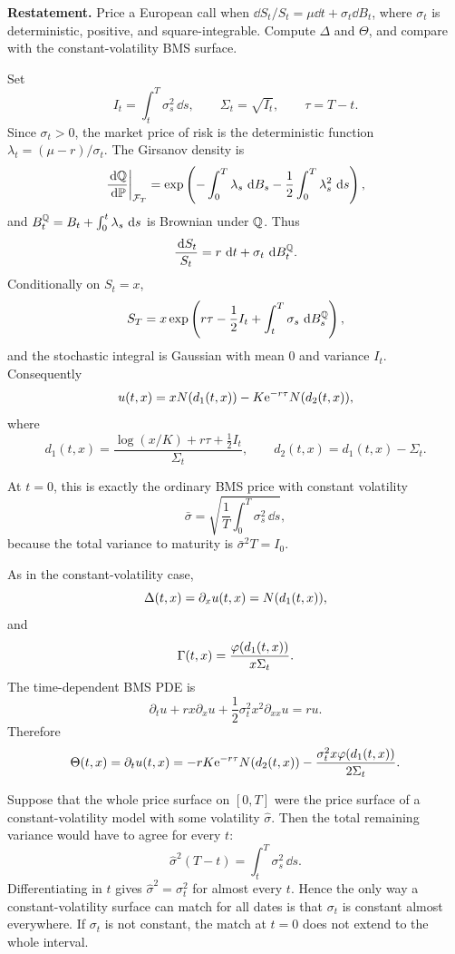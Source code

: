 \begin{exercise}
\textbf{Restatement.}
Price a European call when
\(\dd S_t/S_t=\mu\dd t+\sigma_t\dd B_t\), where \(\sigma_t\) is deterministic,
positive, and square-integrable.  Compute \(\Delta\) and \(\Theta\), and compare
with the constant-volatility BMS surface.

\begin{solution}
Set
\[
  I_t=\int_t^T\sigma_s^2\,\dd s,\qquad \Sigma_t=\sqrt{I_t},
  \qquad \tau=T-t.
\]
Since \(\sigma_t>0\), the market price of risk is the deterministic function
\(\lambda_t=(\mu-r)/\sigma_t\).  The Girsanov density is
\[
  \frac{\,\mathrm{d}\mathbb{Q}}{\,\mathrm{d}\mathbb{P}}\bigg|_{\mathcal{F}_T}
    =\exp\left(
       -\int_0^T\lambda_s\,\,\mathrm{d} B_s
       -\frac12\int_0^T\lambda_s^2\,\,\mathrm{d} s
     \right),
\]
and \(B_t^{\mathbb{Q}}=B_t+\int_0^t\lambda_s\,\,\mathrm{d} s\) is Brownian under \(\mathbb{Q}\).  Thus
\[
  \frac{\,\mathrm{d} S_t}{S_t}=r\,\,\mathrm{d} t+\sigma_t\,\,\mathrm{d} B_t^{\mathbb{Q}}.
\]
Conditionally on \(S_t=x\),
\[
  S_T=x\exp\left(r\tau-\frac12I_t+\int_t^T\sigma_s\,\,\mathrm{d} B_s^{\mathbb{Q}}\right),
\]
and the stochastic integral is Gaussian with mean \(0\) and variance \(I_t\).
Consequently
\[
  u(t,x)=xN(d_1(t,x))-K\mathrm{e}^{-r\tau}N(d_2(t,x)),
\]
where
\[
  d_1(t,x)=\frac{\log(x/K)+r\tau+\frac12 I_t}{\Sigma_t},
  \qquad
  d_2(t,x)=d_1(t,x)-\Sigma_t.
\]

At \(t=0\), this is exactly the ordinary BMS price with constant volatility
\[
  \bar\sigma=\sqrt{\frac1T\int_0^T\sigma_s^2\,\dd s},
\]
because the total variance to maturity is
\(\bar\sigma^2T=I_0\).

As in the constant-volatility case,
\[
  \Delta(t,x)=\partial_xu(t,x)=N(d_1(t,x)),
\]
and
\[
  \Gamma(t,x)=\frac{\varphi(d_1(t,x))}{x\Sigma_t}.
\]
The time-dependent BMS PDE is
\[
  \partial_tu+rx\partial_xu+\frac12\sigma_t^2x^2\partial_{xx}u=ru.
\]
Therefore
\[
  \Theta(t,x)=\partial_tu(t,x)
    =-rK\mathrm{e}^{-r\tau}N(d_2(t,x))
     -\frac{\sigma_t^2x\varphi(d_1(t,x))}{2\Sigma_t}.
\]

Suppose that the whole price surface on \([0,T]\) were the price surface of a
constant-volatility model with some volatility \(\widehat\sigma\).  Then the
total remaining variance would have to agree for every \(t\):
\[
  \widehat\sigma^2(T-t)=\int_t^T\sigma_s^2\,\dd s.
\]
Differentiating in \(t\) gives \(\widehat\sigma^2=\sigma_t^2\) for almost every
\(t\).  Hence the only way a constant-volatility surface can match for all
dates is that \(\sigma_t\) is constant almost everywhere.  If \(\sigma_t\) is not
constant, the match at \(t=0\) does not extend to the whole interval.
\end{solution}
\end{exercise}
